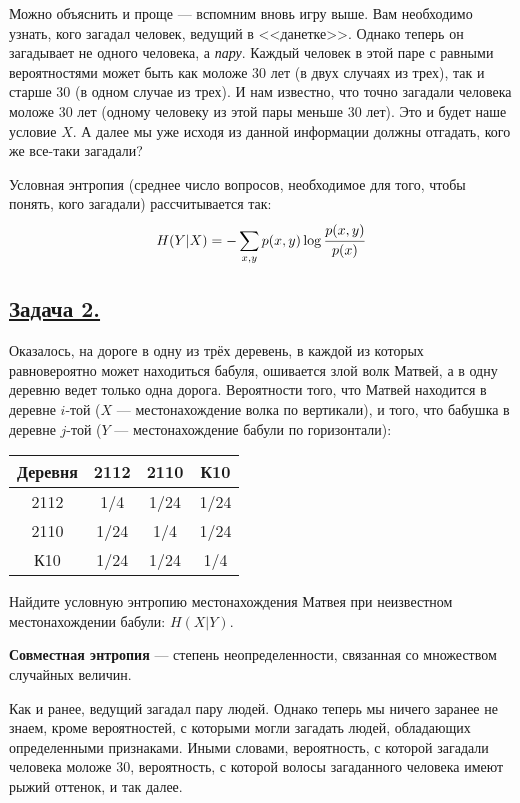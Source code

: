 Можно объяснить и проще --- вспомним вновь игру выше. Вам необходимо узнать, кого загадал человек, ведущий в <<данетке>>. Однако теперь он загадывает не одного человека, а \textit{пару}. Каждый человек в этой паре с равными вероятностями может быть как моложе 30 лет (в двух случаях из трех), так и старше 30 (в одном случае из трех). И нам известно, что точно загадали человека моложе 30 лет (одному человеку из этой пары меньше 30 лет). Это и будет наше условие $X$. А далее мы уже исходя из данной информации должны отгадать, кого же все-таки загадали?

Условная энтропия (среднее число вопросов, необходимое для того, чтобы понять, кого загадали) рассчитывается так:
\[H(Y|X)=-\sum\limits_{x, y} p(x, y)\log \cfrac{p(x, y)}{p(x)} \]

\subsection*{\hyperref[sec:sol_problem2]{Задача 2.}}\label{sec:problem2} Оказалось, на дороге в одну из трёх деревень, в каждой из которых равновероятно может находиться бабуля, ошивается злой волк Матвей, а в одну деревню ведет только одна дорога. Вероятности того, что Матвей находится в деревне $i$-той ($X$ --- местонахождение волка по вертикали), и того, что бабушка в деревне $j$-той ($Y$ --- местонахождение бабули по горизонтали):
\begin{center}
    \begin{tabular}{c||c|c|c}
        Деревня & 2112 & 2110 & К10 \\
        \hline
        \hline
        2112 & 1/4 & 1/24 & 1/24 \\
        \hline
        2110 & 1/24 & 1/4 & 1/24 \\
        \hline
        К10 & 1/24 & 1/24 & 1/4 \\
    \end{tabular}
\end{center}

Найдите условную энтропию местонахождения Матвея при неизвестном местонахождении бабули: $H(X|Y)$. 
\\

\begin{siderules}
    \textbf{Совместная энтропия} --- степень неопределенности, связанная со множеством случайных величин.
\end{siderules}

Как и ранее, ведущий загадал пару людей. Однако теперь мы ничего заранее не знаем, кроме вероятностей, с которыми могли загадать людей, обладающих определенными признаками. Иными словами, вероятность, с которой загадали человека моложе 30, вероятность, с которой волосы загаданного человека имеют рыжий оттенок, и так далее.

